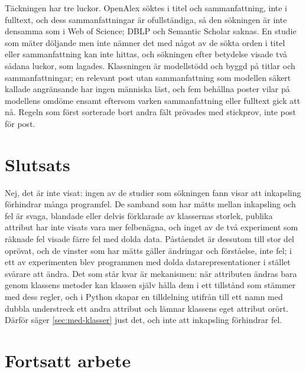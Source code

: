 Täckningen har tre luckor.  OpenAlex söktes i titel och sammanfattning,
inte i fulltext, och dess sammanfattningar är ofullständiga, så den
sökningen är inte densamma som i Web of Science; DBLP och Semantic Scholar
saknas.  En studie som mäter döljande men inte nämner det med något av
de sökta orden i titel eller sammanfattning kan inte hittas, och
sökningen efter betydelse visade två sådana luckor, som lagades.
Klassningen är modellstödd och byggd på titlar och sammanfattningar; en
relevant post utan sammanfattning som modellen säkert kallade angränsande
har ingen människa läst, och fem behållna poster vilar på modellens
omdöme ensamt eftersom varken sammanfattning eller fulltext gick att nå.
Regeln som först sorterade bort andra fält prövades med stickprov, inte
post för post.

\section{Slutsats}
\label{sec:inkf-slutsats}

Nej, det är inte visat: ingen av de studier som sökningen fann visar
att inkapsling förhindrar många programfel.  De samband som har mätts
mellan inkapsling
och fel är svaga, blandade eller delvis förklarade av klassernas storlek,
publika attribut har inte visats vara mer felbenägna, och inget av de två
experiment som räknade fel visade färre fel med dolda data.  Påståendet
är dessutom till stor del oprövat, och de vinster som har mätts gäller
ändringar och förståelse, inte fel; i ett av experimenten blev
programmen med dolda datarepresentationer i stället svårare att ändra.
Det som står kvar är mekanismen: när attributen ändras bara genom
klassens metoder kan klassen själv hålla dem i ett tillstånd som stämmer
med dess regler, och i Python skapar en tilldelning utifrån till ett
namn med dubbla understreck ett andra attribut och lämnar klassens eget
attribut orört.  Därför säger \cref{sec:med-klasser}
just det, och inte att inkapsling förhindrar fel.

\section{Fortsatt arbete}
\label{sec:inkf-fortsatt}

